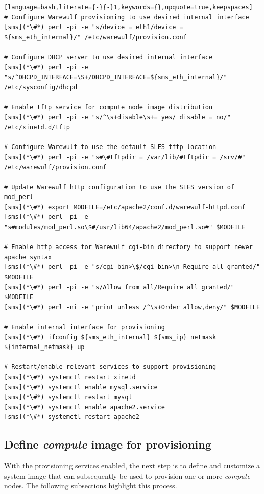 \documentclass[letterpaper]{article}
\begin{document}
\begin{lstlisting}[language=bash,literate={-}{-}1,keywords={},upquote=true,keepspaces]
# Configure Warewulf provisioning to use desired internal interface
[sms](*\#*) perl -pi -e "s/device = eth1/device = ${sms_eth_internal}/" /etc/warewulf/provision.conf

# Configure DHCP server to use desired internal interface
[sms](*\#*) perl -pi -e "s/^DHCPD_INTERFACE=\S+/DHCPD_INTERFACE=${sms_eth_internal}/" /etc/sysconfig/dhcpd

# Enable tftp service for compute node image distribution
[sms](*\#*) perl -pi -e "s/^\s+disable\s+= yes/ disable = no/" /etc/xinetd.d/tftp

# Configure Warewulf to use the default SLES tftp location
[sms](*\#*) perl -pi -e "s#\#tftpdir = /var/lib/#tftpdir = /srv/#" /etc/warewulf/provision.conf

# Update Warewulf http configuration to use the SLES version of mod_perl
[sms](*\#*) export MODFILE=/etc/apache2/conf.d/warewulf-httpd.conf
[sms](*\#*) perl -pi -e "s#modules/mod_perl.so\$#/usr/lib64/apache2/mod_perl.so#" $MODFILE

# Enable http access for Warewulf cgi-bin directory to support newer apache syntax
[sms](*\#*) perl -pi -e "s/cgi-bin>\$/cgi-bin>\n Require all granted/" $MODFILE
[sms](*\#*) perl -pi -e "s/Allow from all/Require all granted/" $MODFILE
[sms](*\#*) perl -ni -e "print unless /^\s+Order allow,deny/" $MODFILE

# Enable internal interface for provisioning
[sms](*\#*) ifconfig ${sms_eth_internal} ${sms_ip} netmask ${internal_netmask} up

# Restart/enable relevant services to support provisioning
[sms](*\#*) systemctl restart xinetd
[sms](*\#*) systemctl enable mysql.service
[sms](*\#*) systemctl restart mysql
[sms](*\#*) systemctl enable apache2.service
[sms](*\#*) systemctl restart apache2
\end{lstlisting}


\subsection{Define {\em compute} image for provisioning}

With the provisioning services enabled, the next step is to define and
customize a system image that can subsequently be used to provision one or more
{\em compute} nodes. The following subsections highlight this process.
\end{document}
